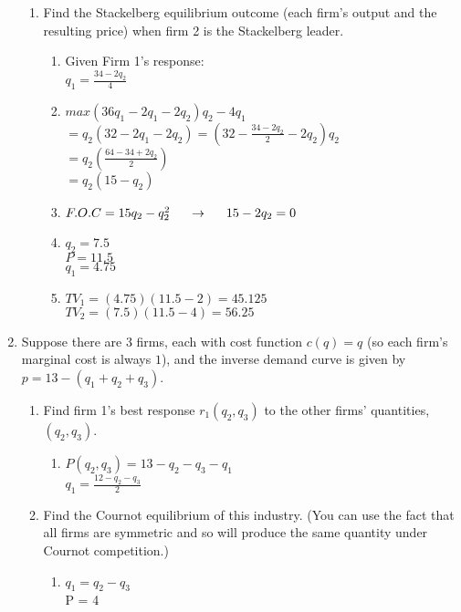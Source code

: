 \documentclass[11pt]{article}
\begin{document}
\begin{enumerate}
\begin{enumerate}
        \item Find the Stackelberg equilibrium outcome (each firm's output and the resulting price) when firm 2 is the Stackelberg leader.
        \begin{enumerate}
            \item Given Firm 1's response:\\
            $q_1 = \frac{34-2q_2}{4}$
            \item $max(36q_1 - 2q_1 - 2q_2)q_2 - 4q_1$\\
            $=q_2(32-2q_1-2q_2)=(32 - \frac{34-2q_2}{2}-2q_2)q_2$\\
            $=q_2(\frac{64-34+2q_2}{2})$\\
            $=q_2(15-q_2)$
            \item $F.O.C = 15q_2 - q_2^2  \hspace{0.5cm}  \rightarrow  \hspace{0.5cm}   15-2q_2 = 0$
            \item $q_2 = 7.5$\\ $P = 11.5$\\ $q_1 = 4.75$
            \item $TV_1 = (4.75)(11.5-2) = 45.125$\\
            $TV_2 = (7.5)(11.5-4) = 56.25$
        \end{enumerate}
    \end{enumerate}
\pagebreak
\item Suppose there are $3$ firms, each with cost function $c(q)=q$ (so each firm's marginal cost is always $1$), and the inverse demand curve is given by $p=13-(q_{1}+q_{2}+q_{3})$.
    \begin{enumerate}
        \item Find firm 1's best response $r_{1}(q_{2},q_{3})$ to the other firms' quantities, $(q_{2},q_{3})$.
        \begin{enumerate}
            \item $P(q_2, q_3) = 13-q_2-q_3-q_1$\\
            $q_1 = \frac{12-q_2-q_3}{2}$
        \end{enumerate}

        \item Find the Cournot equilibrium of this industry. (You can use the fact that all firms are symmetric and so will produce the same quantity under Cournot competition.)
        \begin{enumerate}
            \item $q_1 = q_2 - q_3$\\
            P = 4
        \end{enumerate}


\end{enumerate}
\end{enumerate}
\end{document}
